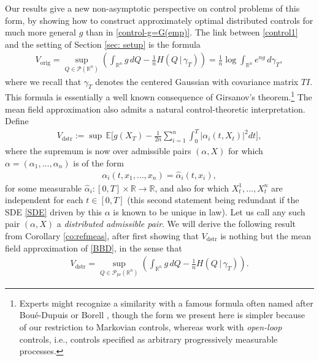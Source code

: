 \documentclass[11pt,reqno]{amsart}
\numberwithin{equation}{section}
\theoremstyle{definition}
\def\E{{\mathbb E}}
\def\R{{\mathbb R}}
\def\P{{\mathcal P}}
\def\Pprod{\P_{\mathrm{pr}}}
\begin{document}
Our results give a new non-asymptotic perspective on control problems of this form, by showing how to construct approximately optimal distributed controls for much more general $g$ than in \eqref{control-g=G(emp)}.
The link between  \eqref{control1} and the setting of Section \ref{sec: setup} is the formula 
\begin{align}
	V_{\mathrm{orig}} = \sup_{Q \in \P(\R^n)} \left(\int_{\R^n} g\,dQ - \frac{1}{n}H(Q\,|\,\gamma_T)\right) = \frac{1}{n}\log\int_{\R^n} e^{ng}\,d\gamma_T, \label{BBD}
\end{align}
where we recall that $\gamma_T$ denotes the centered Gaussian with covariance matrix $TI$.
This formula is essentially a well known consequence of Girsanov's theorem.\footnote{Experts might recognize a similarity with a famous formula often named after Bou\'e-Dupuis \cite{boue1998variational} or Borell \cite{borell2000diffusion}, though the form we present here is simpler because of our restriction to Markovian controls, whereas \cite{boue1998variational,borell2000diffusion} work with \emph{open-loop} controls, i.e., controls specified as arbitrary progressively measurable processes.}
The mean field approximation  also admits a natural control-theoretic interpretation. Define
\begin{align}
	V_{\mathrm{dstr}} := \sup \, \E\Bigg[ g(X_T) -  \frac{1}{2n} \sum_{i=1}^n \int_0^T |\alpha_i(t,X_t)|^2dt\Bigg], \label{control-distr}
\end{align}
where the supremum is now over admissible pairs $(\alpha,X)$ for which $\alpha=(\alpha_1,\ldots,\alpha_n)$ is of the form
\begin{align*}
	\alpha_i(t,x_1,\ldots,x_n) = \widehat\alpha_i(t,x_i),
\end{align*}
for some measurable $\widehat\alpha_i : [0,T] \times \R \to \R$, and also for which $X^1_t,\ldots,X^n_t$ are independent for each $t \in [0,T]$ (this second statement being redundant if the SDE \eqref{SDE} driven by this $\alpha$ is known to be unique in law).
Let us call any such pair $(\alpha,X)$ a \emph{distributed admissible pair}.
We will derive the following result from Corollary \ref{co:refmeas}, after first showing that $V_{\mathrm{dstr}}$ is nothing but the mean field approximation of \eqref{BBD}, in the sense that
\begin{align}
	V_{\mathrm{dstr}} = \sup_{Q \in \Pprod(\R^n)} \left(\int_{\R^n} g\,dQ - \frac{1}{n}H(Q\,|\,\gamma_T)\right) . \label{BBD-MF}
\end{align}
\end{document}
